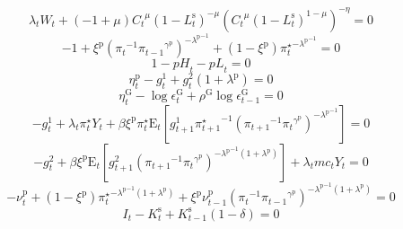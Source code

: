 \begin{equation}
{\lambda_{t}} {W_{t}} + \left(-1 + \mu\right) {{C_{t}}^{\mu}} {\left(1 - L^{\mathrm{s}}_{t}\right)^{-\mu}} {\left({{C_{t}}^{\mu}} {\left(1 - L^{\mathrm{s}}_{t}\right)^{1 - \mu}}\right)^{-\eta}} = 0
\end{equation}
\begin{equation}
-1 + {\xi^{\mathrm{p}}} {\left({\pi_{t}}^{-1} {{\pi_{t-1}}^{\gamma^{\mathrm{p}}}}\right)^{-{\lambda^{\mathrm{p}}}^{-1}}} + \left(1 - \xi^{\mathrm{p}}\right) {{\pi^{\star}_{t}}^{-{\lambda^{\mathrm{p}}}^{-1}}} = 0
\end{equation}
\begin{equation}
1 - {p\!H}_{t} - {p\!L}_{t} = 0
\end{equation}
\begin{equation}
\eta^{\mathrm{p}}_{t} - g^{\mathrm{1}}_{t} + {g^{\mathrm{2}}_{t}} \left(1 + \lambda^{\mathrm{p}}\right) = 0
\end{equation}
\begin{equation}
\eta^{\mathrm{G}}_{t} - \log{\epsilon^{\mathrm{G}}_{t}} + {\rho^{\mathrm{G}}} {\log{\epsilon^{\mathrm{G}}_{t-1}}} = 0
\end{equation}
\begin{equation}
-g^{\mathrm{1}}_{t} + {\lambda_{t}} {\pi^{\star}_{t}} {Y_{t}} + {\beta} {\xi^{\mathrm{p}}} {\pi^{\star}_{t}} {\mathrm{E}_{t}\left[{g^{\mathrm{1}}_{t+1}} {\pi^{\star}_{t+1}}^{-1} {\left({\pi_{t+1}}^{-1} {{\pi_{t}}^{\gamma^{\mathrm{p}}}}\right)^{-{\lambda^{\mathrm{p}}}^{-1}}}\right]} = 0
\end{equation}
\begin{equation}
-g^{\mathrm{2}}_{t} + {\beta} {\xi^{\mathrm{p}}} {\mathrm{E}_{t}\left[{g^{\mathrm{2}}_{t+1}} {\left({\pi_{t+1}}^{-1} {{\pi_{t}}^{\gamma^{\mathrm{p}}}}\right)^{-{\lambda^{\mathrm{p}}}^{-1} \left(1 + \lambda^{\mathrm{p}}\right)}}\right]} + {\lambda_{t}} {{m\!c}_{t}} {Y_{t}} = 0
\end{equation}
\begin{equation}
-\nu^{\mathrm{p}}_{t} + \left(1 - \xi^{\mathrm{p}}\right) {{\pi^{\star}_{t}}^{-{\lambda^{\mathrm{p}}}^{-1} \left(1 + \lambda^{\mathrm{p}}\right)}} + {\xi^{\mathrm{p}}} {\nu^{\mathrm{p}}_{t-1}} {\left({\pi_{t}}^{-1} {{\pi_{t-1}}^{\gamma^{\mathrm{p}}}}\right)^{-{\lambda^{\mathrm{p}}}^{-1} \left(1 + \lambda^{\mathrm{p}}\right)}} = 0
\end{equation}
\begin{equation}
I_{t} - K^{\mathrm{s}}_{t} + {K^{\mathrm{s}}_{t-1}} \left(1 - \delta\right) = 0
\end{equation}
